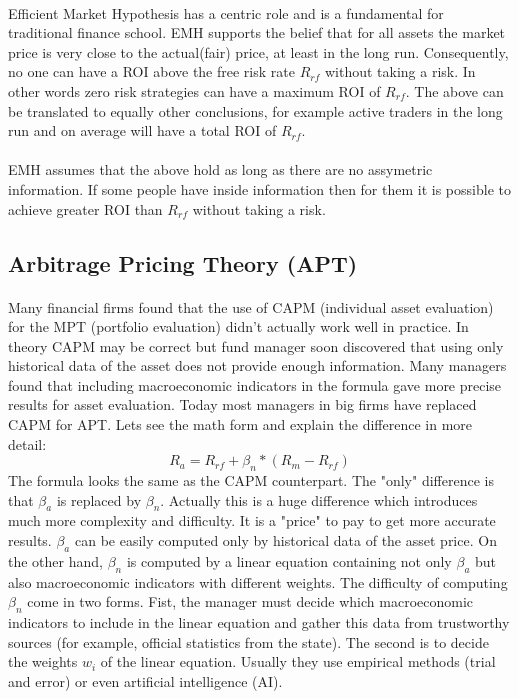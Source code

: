 \documentclass{article}
\begin{document}
\paragraph{ }

Efficient Market Hypothesis has a centric role and is a fundamental for traditional finance school. EMH supports the belief that for all assets the market price is very close to the actual(fair) price, at least in the long run. Consequently, no one can have a ROI above the free risk rate $R_{rf}$ without taking a risk. In other words zero risk strategies can have a maximum ROI of $R_{rf}$. The above can be translated to equally other conclusions, for example active traders in the long run and on average will have a total ROI of $R_{rf}$.
\paragraph{ }
EMH assumes that the above hold as long as there are no assymetric information. If some people have inside information then for them it is possible to achieve greater ROI than $R_{rf}$ without taking a risk.

\subsection{Arbitrage Pricing Theory (APT)}
\paragraph{ }
Many financial firms found that the use of CAPM (individual asset evaluation) for the MPT (portfolio evaluation) didn't actually work well in practice. In theory CAPM may be correct but fund manager soon discovered that using only historical data of the asset does not provide enough information. Many managers found that including macroeconomic indicators in the formula gave more precise results for asset evaluation. Today most managers in big firms have replaced CAPM for APT. Lets see the math form and explain the difference in more detail:
$$R_{a} = R_{rf}+\beta_{n}*(R_{m}-R_{rf})$$
The formula looks the same as the CAPM counterpart. The "only" difference is that $\beta_{a}$ is replaced by $\beta_{n}$. Actually this is a huge difference which introduces much more complexity and difficulty. It is a "price" to pay to get more accurate results. $\beta_{a}$ can be easily computed only by historical data of the asset price. On the other hand, $\beta_{n}$ is computed by a linear equation containing not only $\beta_{a}$ but also macroeconomic indicators with different weights. The difficulty of computing $\beta_{n}$ come in two forms. Fist, the manager must decide which macroeconomic indicators to include in the linear equation and gather this data from trustworthy sources (for example, official statistics from the state). The second is to decide the weights $w_{i}$ of the linear equation. Usually they use empirical methods (trial and error) or even artificial intelligence (AI).
\end{document}
